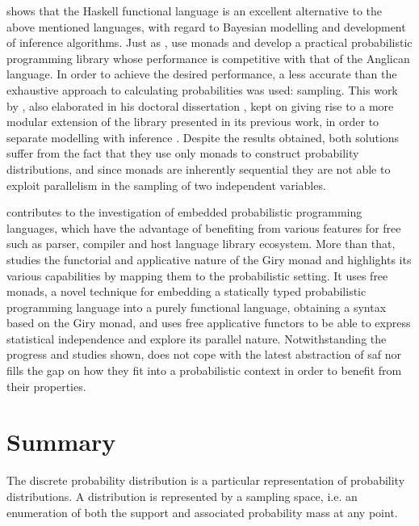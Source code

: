 \documentclass[
  oneside,
  11pt, a4paper,
  footinclude=true,
  headinclude=true,
  cleardoublepage=empty
]{scrbook}
\theoremstyle{definition}
\theoremstyle{definition}
\begin{document}
        \cite{Scibior:2015:PPP:2887747.2804317} shows that the Haskell functional language is an excellent alternative to the above mentioned languages, ​with regard to Bayesian modelling and development of inference algorithms. Just as \cite{erwig_kollmansberger_2006}, \cite{Scibior:2015:PPP:2887747.2804317} use monads and develop a practical probabilistic programming library whose performance is competitive with that of the Anglican language. In order to achieve the desired performance, a less accurate than the exhaustive approach to calculating probabilities was used: sampling. This work by \cite{Scibior:2015:PPP:2887747.2804317}, also elaborated in his doctoral dissertation \citep{Scibior19}, kept on giving rise to a more modular extension of the library presented in its previous work, in order to separate modelling with inference \citep{scibior2018functional}. Despite the results obtained, both solutions suffer from the fact that they use only monads to construct probability distributions, and since monads are inherently sequential they are not able to exploit parallelism in the sampling of two independent variables.
                
        \cite{jtobin} contributes to the investigation of embedded probabilistic programming languages, which have the advantage of benefiting from various features for free such as parser, compiler and host language library ecosystem. More than that, \cite{jtobin} studies the functorial and applicative nature of the Giry monad and highlights its various capabilities by mapping them to the probabilistic setting. It uses free monads, a novel technique for embedding a statically typed probabilistic programming language into a purely functional language, obtaining a syntax based on the Giry monad, and uses free applicative functors to be able to express statistical independence and explore its parallel nature. Notwithstanding the progress and studies shown, \cite{jtobin} does not cope with the latest abstraction of \gls{saf} nor fills the gap on how they fit into a probabilistic context in order to benefit from their properties.
        
    \section{Summary}\label{sec-summary}
    
    The discrete probability distribution is a particular representation of probability distributions. A distribution is represented by a sampling space, i.e. an enumeration of both the support and associated probability mass at any point.
    
\end{document}
